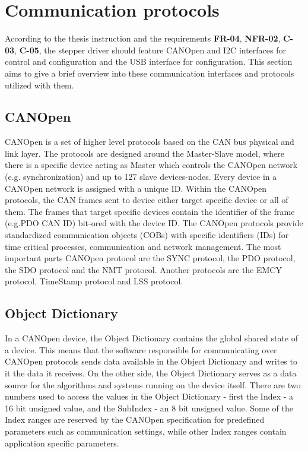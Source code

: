 \section{Communication protocols}
\label{sec:comm_protocols}
According to the thesis instruction and the requirements \textbf{FR-04}, \textbf{NFR-02}, \textbf{C-03}, \textbf{C-05},  the stepper driver should feature CANOpen and I2C interfaces for control and configuration and the USB interface for configuration.
This section aims to give a brief overview into these communication interfaces and protocols utilized with them.

\subsection{CANOpen}
\label{subsec:canopen}
CANOpen is a set of higher level protocols based on the CAN bus physical and link layer.
The protocols are designed around the Master-Slave model, where there is a specific device acting as Master which controls the CANOpen network (e.g. synchronization) and up to 127 slave devices-nodes.
Every device in a CANOpen network is assigned with a unique ID.
Within the CANOpen protocols, the CAN frames sent to device either target specific device or all of them.
The frames that target specific devices contain the identifier of the frame (e.g.PDO CAN ID) bit-ored with the device ID.
The CANOpen protocols provide standardized communication objects (COBs) with specific identifiers (IDs) for time critical processes, communication and network management\cite{cia}.
The most important parts CANOpen protocol are the SYNC protocol, the PDO protocol, the SDO protocol and the NMT protocol.
Another protocols are the EMCY protocol, TimeStamp protocol and LSS protocol.

\subsection{Object Dictionary}
\label{subsec:object_dictionary}
In a CANOpen device, the Object Dictionary contains the global shared state of a device.
This means that the software responsible for communicating over CANOpen protocols sends data available in the Object Dictionary and writes to it the data it receives.
On the other side, the Object Dictionary serves as a data source for the algorithms and systems running on the device itself.
There are two numbers used to access the values in the Object Dictionary - first the Index - a 16 bit unsigned value, and the SubIndex - an 8 bit unsigned value.
Some of the Index ranges are reserved by the CANOpen specification for predefined parameters such as communication settings, while other Index ranges contain application specific parameters\cite{cia}.

